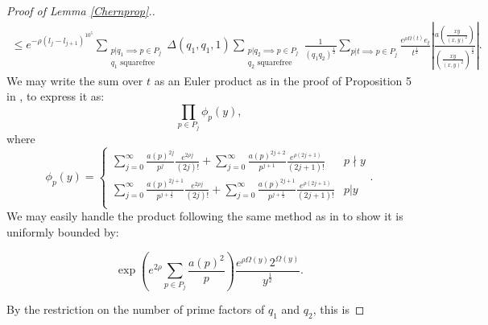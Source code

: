 \documentclass[12pt]{amsart}
\numberwithin{equation}{section}
\numberwithin{thm}{section}
\newcommand{\1}{\mathbf 1}
\begin{document}
\begin{proof}[Proof of Lemma \ref{Chernprop}.]
		\begin{equation}\label{Rankin2}\begin{split}
				\le e^{-\rho(l_j-l_{j+1})^{10^5}} \sum_{\substack{p|q_1\implies p\in P_{j}\\ q_1\text{  squarefree}}}\Delta(q_1,q_1,1)  \sum_{\substack{p|q_2\implies p\in P_{j}\\ q_2\text{  squarefree}}}\frac{1}{(q_1q_2)^{\frac{1}{2}}}\sum_{p|t\implies p\in P_j}\frac{e^{\rho\Omega(t)} e_t}{t^{\frac{1}{2}}}
				\left|\frac{a\left(\frac{xy}{(x,y)^2}\right)}{\left(\frac{xy}{(x,y)^2 }\right)^{\frac{1}{2}}}\right|. 
			\end{split}
		\end{equation}
		We may  write the sum over $t$ as an Euler product as in the proof of Proposition 5 in \cite{RS2}, to express it as:		
		\begin{equation}\prod_{p\in P_{j}}\phi_p(y),\end{equation} where
		\begin{equation}
			\phi_p(y)=\begin{cases}
				\sum^\infty_{j=0} \frac{a(p)^{2j}}{p^j} \frac{e^{2\rho j}}{(2j)!}+\sum^{\infty}_{j=0} \frac{a(p)^{2j+2}}{p^{j+1}}\frac{e^{\rho(2j+1)}}{(2j+1)!}&p\nmid y\\
				\sum^\infty_{j=0} \frac{a(p)^{2j+1}}{p^{j+\frac{1}{2}}} \frac{e^{2\rho j}}{(2j)!}+\sum^{\infty}_{j=0} \frac{a(p)^{2j+1}}{p^{j+\frac{1}{2}}}\frac{e^{\rho(2j+1)}}{(2j+1)!}&p|y\\			
			\end{cases}	.	\end{equation}
We may easily handle the product following the same method as in \cite{RS2} to show it is uniformly bounded by:

\begin{equation}
	\exp\left(e^{2\rho}\sum_{p\in P_{j}} \frac{a(p)^2}{p}\right)\frac{e^{\rho\Omega(y)}2^{\Omega(y)}}{y^{\frac{1}{2}}}.
\end{equation}

By the restriction on the number of prime factors of $q_1$ and $q_2$, this is 


\end{proof}
\end{document}
